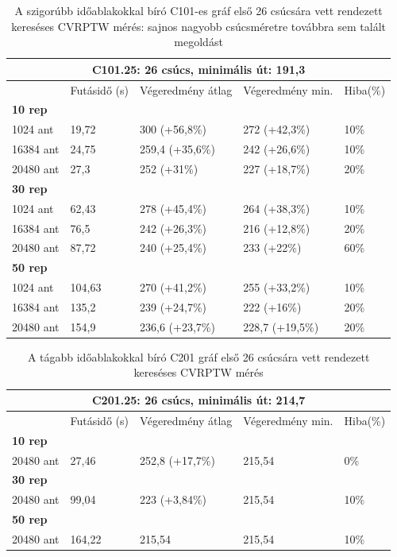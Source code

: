 \begin{table}[ht!]
	\centering
	\begin{tabular}{|p{1.75cm}||p{2cm}|p{3.25cm}|p{3.25cm}|p{1.5cm}|}
		\hline
		\multicolumn{5}{|c|}{C101.25: 26 csúcs, minimális út: 191,3} \\
		\hline
		& Futásidő (s) & Végeredmény átlag & Végeredmény min. & Hiba(\%) \\
		\hline
		\textbf{10 rep} &  &  &  & \\
		1024 ant & 19,72 & 300 (+56,8\%) & 272 (+42,3\%) &  10\% \\
		16384 ant & 24,75 & 259,4 (+35,6\%) & 242 (+26,6\%) &  10\% \\
		20480 ant & 27,3 & 252 (+31\%) & 227 (+18,7\%) &  20\% \\
		\hline
		\textbf{30 rep} &  &  &  & \\
		1024 ant & 62,43 & 278 (+45,4\%) & 264 (+38,3\%) &  10\% \\
		16384 ant & 76,5 & 242 (+26,3\%) & 216 (+12,8\%) &  20\% \\
		20480 ant & 87,72 & 240 (+25,4\%) & 233 (+22\%) &  60\% \\
		\hline
		\textbf{50 rep} &  &  &  &  \\
		1024 ant & 104,63 & 270 (+41,2\%) & 255 (+33,2\%) &  10\% \\
		16384 ant & 135,2 & 239 (+24,7\%) & 222 (+16\%) &  20\% \\
		20480 ant & 154,9 & 236,6 (+23,7\%) & 228,7 (+19,5\%) &  20\% \\
		\hline
	\end{tabular}
	\caption{A szigorúbb időablakokkal bíró C101-es gráf első 26 csúcsára vett rendezett kereséses CVRPTW mérés: sajnos nagyobb csúcsméretre továbbra sem talált megoldást}
	\label{table:VRTPW2_25_1}
\end{table}

\begin{table}[ht!]
	\centering
	\begin{tabular}{|p{1.75cm}||p{2cm}|p{3.25cm}|p{3.25cm}|p{1.5cm}|}
		\hline
		\multicolumn{5}{|c|}{C201.25: 26 csúcs, minimális út: 214,7} \\
		\hline
		& Futásidő (s) & Végeredmény átlag & Végeredmény min. & Hiba(\%) \\
		\hline
		\textbf{10 rep} &  &  &  & \\
		20480 ant & 27,46 & 252,8 (+17,7\%) & 215,54 &  0\% \\
		\hline
		\textbf{30 rep} &  &  &  & \\
		20480 ant & 99,04 & 223 (+3,84\%) & 215,54 &  10\% \\
		\hline
		\textbf{50 rep} &  &  &  &  \\
		20480 ant & 164,22 & 215,54 & 215,54 &  10\% \\
		\hline
	\end{tabular}
	\caption{A tágabb időablakokkal bíró C201 gráf első 26 csúcsára vett rendezett kereséses CVRPTW mérés}
	\label{table:VRTPW2_25_2}
\end{table}

